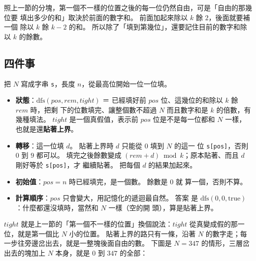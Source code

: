 照上一節的分塊，第一個不一樣的位置之後的每一位仍然自由，可是「自由的那幾位要
填出多少的和」取決於前面的數字和。 前面加起來除以 $k$ 餘 $2$，後面就要補一個
除以 $k$ 餘 $k - 2$ 的和。 所以除了「填到第幾位」，還要記住目前的數字和除以
$k$ 的餘數。

\subsection{四件事}

把 $N$ 寫成字串 \texttt{s}，長度 $n$，從最高位開始一位一位填。

\begin{itemize}
\item \textbf{狀態}：$\mathrm{dfs}(\mathit{pos}, \mathit{rem}, \mathit{tight})$
＝ 已經填好前 $\mathit{pos}$ 位、這幾位的和除以 $k$ 餘 $\mathit{rem}$ 時，把剩
下的位數填完、讓整個數不超過 $N$ 而且數字和是 $k$ 的倍數，有幾種填法。
$\mathit{tight}$ 是一個真假值，表示前 $\mathit{pos}$ 位是不是每一位都和 $N$
一樣，也就是還\textbf{貼著上界}。
\item \textbf{轉移}：這一位填 $d$。 貼著上界時 $d$ 只能從 $0$ 填到 $N$ 的這一
位 \texttt{s[pos]}，否則 $0$ 到 $9$ 都可以。 填完之後餘數變成
$(\mathit{rem} + d) \bmod k$；原本貼著、而且 $d$ 剛好等於 \texttt{s[pos]}，才
繼續貼著。 把每個 $d$ 的結果加起來。
\item \textbf{初始值}：$\mathit{pos} = n$ 時已經填完，是一個數。 餘數是 $0$ 就
算一個，否則不算。
\item \textbf{計算順序}：$\mathit{pos}$ 只會變大，用記憶化的遞迴最自然。 答案
是 $\mathrm{dfs}(0, 0, \text{true})$：什麼都還沒填時，當然和 $N$ 一樣（空的開
頭），算是貼著上界。
\end{itemize}

$\mathit{tight}$ 就是上一節的「第一個不一樣的位置」換個說法：$\mathit{tight}$
從真變成假的那一位，就是第一個比 $N$ 小的位置。 貼著上界的路只有一條，沿著
$N$ 的數字走；每一步往旁邊岔出去，就是一整塊後面自由的數。 下圖是 $N = 347$
的情形，三層岔出去的塊加上 $N$ 本身，就是 $0$ 到 $347$ 的全部：

